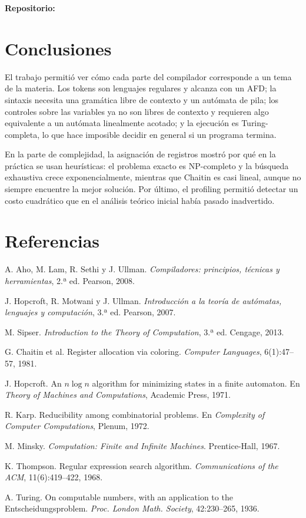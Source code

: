 \documentclass[11pt,a4paper]{article}
\theoremstyle{definition}
\begin{document}
\textbf{Repositorio:} \Repositorio

\section{Conclusiones}

El trabajo permitió ver cómo cada parte del compilador corresponde a un tema
de la materia. Los tokens son lenguajes regulares y alcanza con un AFD; la
sintaxis necesita una gramática libre de contexto y un autómata de pila; los
controles sobre las variables ya no son libres de contexto y requieren algo
equivalente a un autómata linealmente acotado; y la ejecución es
Turing-completa, lo que hace imposible decidir en general si un programa
termina.

En la parte de complejidad, la asignación de registros mostró por qué en la
práctica se usan heurísticas: el problema exacto es NP-completo y la
búsqueda exhaustiva crece exponencialmente, mientras que Chaitin es casi
lineal, aunque no siempre encuentre la mejor solución. Por último, el
profiling permitió detectar un costo cuadrático que en el análisis teórico
inicial había pasado inadvertido.

\section{Referencias}

\begin{enumerate}[label={[\arabic*]}, leftmargin=2em, itemsep=3pt]
\item A. Aho, M. Lam, R. Sethi y J. Ullman. \emph{Compiladores: principios, técnicas y herramientas}, 2.ª ed. Pearson, 2008.
\item J. Hopcroft, R. Motwani y J. Ullman. \emph{Introducción a la teoría de autómatas, lenguajes y computación}, 3.ª ed. Pearson, 2007.
\item M. Sipser. \emph{Introduction to the Theory of Computation}, 3.ª ed. Cengage, 2013.
\item G. Chaitin et al. Register allocation via coloring. \emph{Computer Languages}, 6(1):47--57, 1981.
\item J. Hopcroft. An $n \log n$ algorithm for minimizing states in a finite automaton. En \emph{Theory of Machines and Computations}, Academic Press, 1971.
\item R. Karp. Reducibility among combinatorial problems. En \emph{Complexity of Computer Computations}, Plenum, 1972.
\item M. Minsky. \emph{Computation: Finite and Infinite Machines}. Prentice-Hall, 1967.
\item K. Thompson. Regular expression search algorithm. \emph{Communications of the ACM}, 11(6):419--422, 1968.
\item A. Turing. On computable numbers, with an application to the Entscheidungsproblem. \emph{Proc. London Math. Society}, 42:230--265, 1936.
\end{enumerate}
\end{document}
